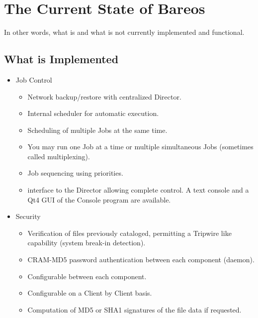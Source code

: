 
\chapter{The Current State of Bareos}
\label{StateChapter}

In other words, what is and what is not currently implemented and functional.

\section{What is Implemented}

\begin{itemize}
\item Job Control
   \begin{itemize}
   \item Network backup/restore with centralized Director.
   \item Internal scheduler for automatic
       execution.
   \item Scheduling of multiple Jobs at the same time.
   \item You may run one Job at a time or multiple simultaneous Jobs
         (sometimes called multiplexing).
   \item Job sequencing using priorities.
   \item {} interface to the Director allowing complete
      control.  A text console and a Qt4 GUI of
      the Console program are available.
   \end{itemize}

\item Security
   \begin{itemize}
   \item Verification of files previously cataloged, permitting a Tripwire like
      capability (system break-in detection).
   \item CRAM-MD5 password authentication between each component (daemon).
   \item Configurable
       between each
            component.
   \item Configurable
      on a Client by Client basis.
   \item Computation of MD5 or SHA1 signatures of the file data if requested.
   \end{itemize}



\end{itemize}

